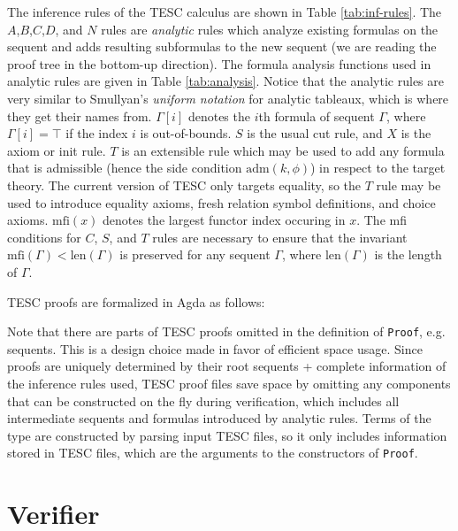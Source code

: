 \documentclass[12pt]{article}
\newcommand{\len}[0]{\mathrm{len}}
\newcommand{\mfi}[0]{\mathrm{mfi}}
\newcommand{\adm}[0]{\mathrm{adm}}
\begin{document}
The inference rules of the TESC calculus are shown in Table \ref{tab:inf-rules}.
The $A$,$B$,$C$,$D$, and $N$ rules are \textit{analytic} rules which analyze  
existing formulas on the sequent and adds resulting subformulas to the new 
sequent (we are reading the proof tree in the bottom-up direction).
The formula analysis functions used in analytic rules are given in Table 
\ref{tab:analysis}. Notice that the analytic rules are very similar to 
Smullyan's \textit{uniform notation} for analytic tableaux, which is where 
they get their names from. $\Gamma[i]$ denotes the $i$th formula of sequent 
$\Gamma$, where $\Gamma[i] = \top$ if the index $i$ is out-of-bounds. 
$S$ is the usual cut rule, and $X$ is the axiom or init rule. $T$ is an 
extensible rule which may be used to add any formula that is admissible 
(hence the side condition $\adm(k,\phi)$)
in respect to the target theory. The current version of TESC only targets
equality, so the $T$ rule may be used to introduce equality axioms,
fresh relation symbol definitions, and choice axioms. $\mfi(x)$ denotes 
the largest functor index occuring in $x$. The mfi conditions for $C$, 
$S$, and $T$ rules are necessary to ensure that the invariant 
$\mfi(\Gamma) < \len(\Gamma)$ is preserved for any sequent $\Gamma$, 
where $\len(\Gamma)$ is the length of $\Gamma$.

TESC proofs are formalized in Agda as follows:

Note that there are parts of TESC proofs omitted in the definition of 
\verb|Proof|, e.g. sequents. This is a design choice made in favor of
efficient space usage. Since proofs are uniquely determined by their
root sequents + complete information of the inference rules used,
TESC proof files save space by omitting any components that can be 
constructed on the fly during verification, which includes all intermediate 
sequents and formulas introduced by analytic rules. Terms of the type 
 are constructed by parsing input TESC files, 
so it only includes information stored in TESC files, which are the arguments 
to the constructors of \verb|Proof|.



\section{Verifier} \label{sec:verifier} 
\end{document}
